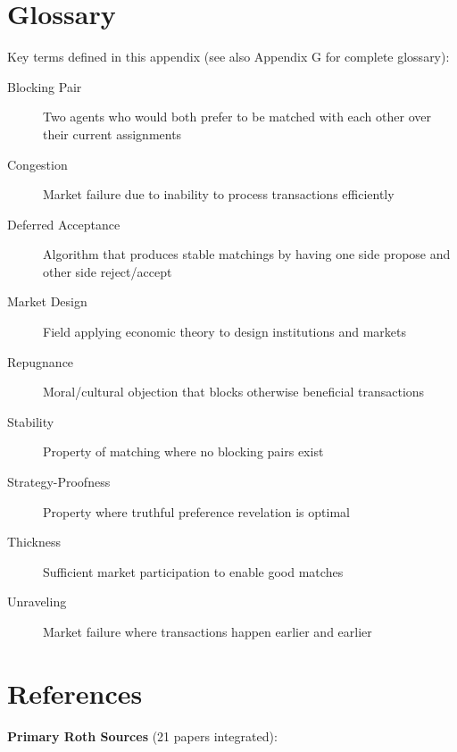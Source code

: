 \section{Glossary}

Key terms defined in this appendix (see also Appendix G for complete glossary):

\begin{description}
    \item[Blocking Pair] Two agents who would both prefer to be matched with each other over their current assignments
    \item[Congestion] Market failure due to inability to process transactions efficiently
    \item[Deferred Acceptance] Algorithm that produces stable matchings by having one side propose and other side reject/accept
    \item[Market Design] Field applying economic theory to design institutions and markets
    \item[Repugnance] Moral/cultural objection that blocks otherwise beneficial transactions
    \item[Stability] Property of matching where no blocking pairs exist
    \item[Strategy-Proofness] Property where truthful preference revelation is optimal
    \item[Thickness] Sufficient market participation to enable good matches
    \item[Unraveling] Market failure where transactions happen earlier and earlier
\end{description}

\section{References}

\nocite{bcm_master}

\textbf{Primary Roth Sources} (21 papers integrated):


